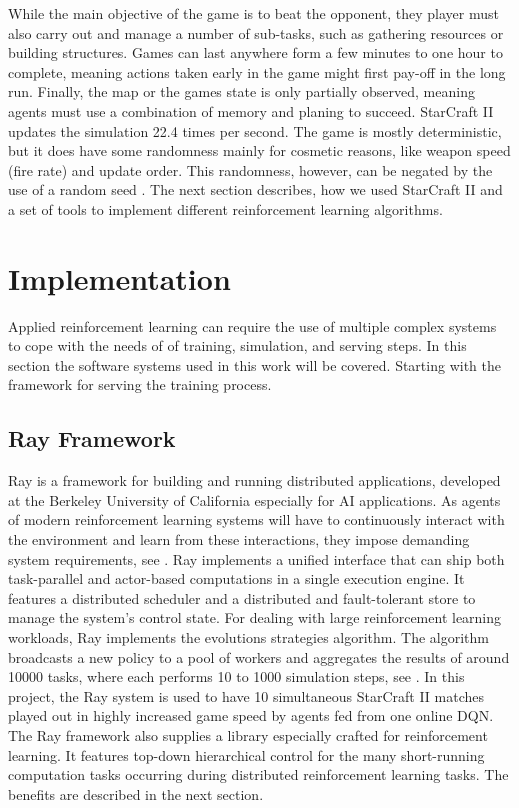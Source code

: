 \documentclass[12pt,a4paper]{article}
\begin{document}
While the main objective of the game is to beat the opponent, they player must also carry out and manage a number of sub-tasks, such as gathering resources or building structures. Games can last anywhere form a few minutes to one hour to complete, meaning actions taken early in the game might first pay-off in the long run. Finally, the map or the games state is only partially observed, meaning agents must use a combination of memory and planing to succeed.
StarCraft II updates the simulation 22.4 times per second. The game is mostly deterministic, but it does have some randomness mainly for cosmetic reasons, like weapon speed (fire rate) and update order. This randomness, however, can be negated by the use of a random seed \cite{DBLP:journals/corr/abs-1708-04782}.
The next section describes, how we used StarCraft II and a set of tools to implement different reinforcement learning algorithms.
\section{Implementation}
Applied reinforcement learning can require the use of multiple complex systems to cope with the needs of of training, simulation, and serving steps. In this section the software systems used in this work will be covered. Starting with the framework for serving the training process.
\subsection{Ray Framework}
Ray is a framework for building and running distributed applications, developed at the Berkeley University of California especially for AI applications. As agents of modern reinforcement learning systems will have to continuously interact with the environment and learn from these interactions, they impose demanding system requirements, see \cite{Moritz2017}. Ray implements a unified interface that can ship both task-parallel and actor-based computations in a single execution engine.
It features a distributed scheduler and a distributed and fault-tolerant store to manage the system's control state.
For dealing with large reinforcement learning workloads, Ray implements the evolutions strategies algorithm. The algorithm broadcasts a new policy to a pool of workers and aggregates the results of around 10000 tasks, where each performs 10 to 1000 simulation steps, see \cite{Moritz2017}.
In this project, the Ray system is used to have 10 simultaneous StarCraft II matches played out in highly increased game speed by agents fed from one online DQN.
The Ray framework also supplies a library especially crafted for reinforcement learning. It features top-down hierarchical control for the many short-running computation tasks occurring during distributed reinforcement learning tasks. The benefits are described in the next section.
\end{document}
